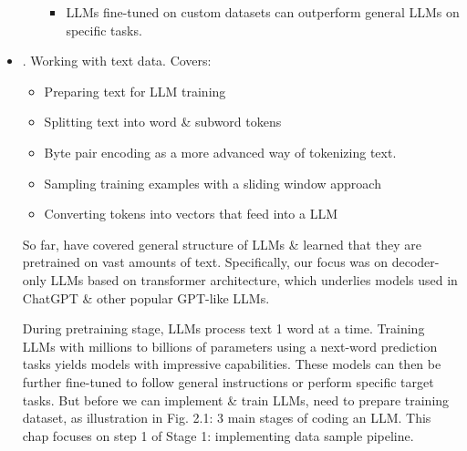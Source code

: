 \documentclass{article}
\begin{document}
\begin{itemize}
\begin{itemize}
\begin{itemize}
			\item LLMs fine-tuned on custom datasets can outperform general LLMs on specific tasks.
		\end{itemize}
	\end{itemize}
	\item {. Working with text data.} Covers:
	\begin{itemize}
		\item Preparing text for LLM training
		\item Splitting text into word \& subword tokens
		\item Byte pair encoding as a more advanced way of tokenizing text.
		\item Sampling training examples with a sliding window approach
		\item Converting tokens into vectors that feed into a LLM
	\end{itemize}
	So far, have covered general structure of LLMs \& learned that they are pretrained on vast amounts of text. Specifically, our focus was on decoder-only LLMs based on transformer architecture, which underlies models used in ChatGPT \& other popular GPT-like LLMs.
	
	During pretraining stage, LLMs process text 1 word at a time. Training LLMs with millions to billions of parameters using a next-word prediction tasks yields models with impressive capabilities. These models can then be further fine-tuned to follow general instructions or perform specific target tasks. But before we can implement \& train LLMs, need to prepare training dataset, as illustration in {\sf Fig. 2.1: 3 main stages of coding an LLM. This chap focuses on step 1 of Stage 1: implementing data sample pipeline.}
	

\end{itemize}
\end{document}
